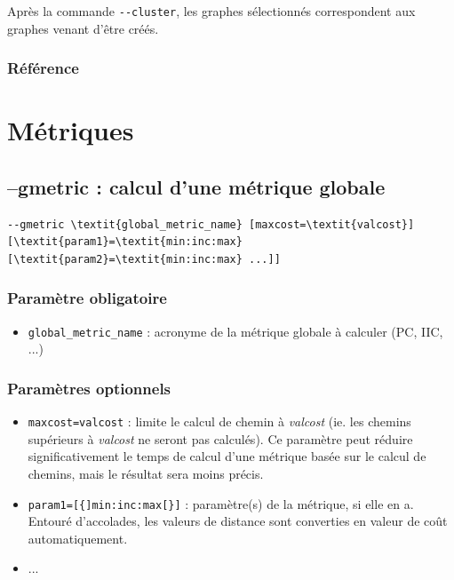\documentclass[a4paper,10pt]{report}
\begin{document}
Après la commande \verb|--cluster|, les graphes sélectionnés correspondent aux graphes venant d'être créés.

\subsubsection{Référence}
\cite{2017_clustering}


\section{Métriques}

\subsection{--gmetric : calcul d'une métrique globale}
\begin{Verbatim}[commandchars=\\\{\}]
--gmetric \textit{global_metric_name} [maxcost=\textit{valcost}] [\textit{param1}=\textit{min:inc:max} [\textit{param2}=\textit{min:inc:max} ...]]
\end{Verbatim}

\subsubsection{Paramètre obligatoire}
\begin{itemize}
	\item \verb|global_metric_name| : acronyme de la métrique globale à calculer (PC, IIC, ...)
\end{itemize}

\subsubsection{Paramètres optionnels}
\begin{itemize}
	\item \verb|maxcost=valcost| : limite le calcul de chemin à \textit{valcost} (ie. les chemins supérieurs à \textit{valcost} ne seront pas calculés). Ce paramètre peut réduire significativement le temps de calcul d'une métrique basée sur le calcul de chemins, mais le résultat sera moins précis.
	\item \verb|param1=[{]min:inc:max[}]| : paramètre(s) de la métrique, si elle en a. Entouré d'accolades, les valeurs de distance sont converties en valeur de coût automatiquement.
	\item ...
\end{itemize}
\end{document}
